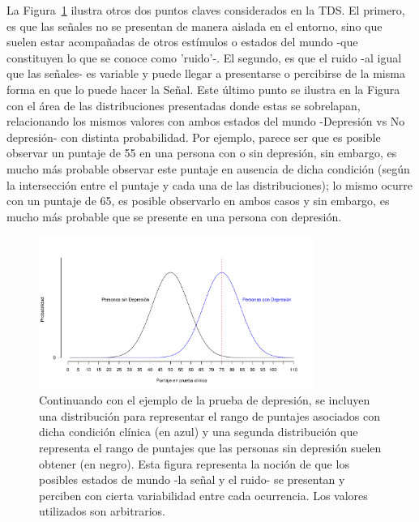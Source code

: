 La Figura~\ref{fig:Noise} ilustra otros dos puntos claves considerados en la TDS. El primero, es que las señales no se presentan de manera aislada en el entorno, sino que suelen estar acompañadas de otros estímulos o estados del mundo -que constituyen lo que se conoce como 'ruido'-. El segundo, es que el ruido -al igual que las señales- es variable y puede llegar a presentarse o percibirse de la misma forma en que lo puede hacer la Señal. Este último punto se ilustra en la Figura con el área de las distribuciones presentadas donde estas se sobrelapan, relacionando los mismos valores con ambos estados del mundo -Depresión vs No depresión- con distinta probabilidad. Por ejemplo, parece ser que es posible observar un puntaje de 55 en una persona con o sin depresión, sin embargo, es mucho más probable observar este puntaje en ausencia de dicha condición (según la intersección entre el puntaje y cada una de las distribuciones); lo mismo ocurre con un puntaje de 65, es posible observarlo en ambos casos y sin embargo, es mucho más probable que se presente en una persona con depresión.\\

\begin{figure}[th]
\centering
\includegraphics[width=0.80\textwidth]{Figures/Noise} 
\caption[Variabilidad en la señal y en el ruido]{Continuando con el ejemplo de la prueba de depresión, se incluyen una distribución para representar el rango de puntajes asociados con dicha condición clínica (en azul) y una segunda distribución que representa el rango de puntajes que las personas sin depresión suelen obtener (en negro). Esta figura representa la noción de que los posibles estados de mundo -la señal y el ruido- se presentan y perciben con cierta variabilidad entre cada ocurrencia. Los valores utilizados son arbitrarios.}
\label{fig:Noise}
\end{figure}

